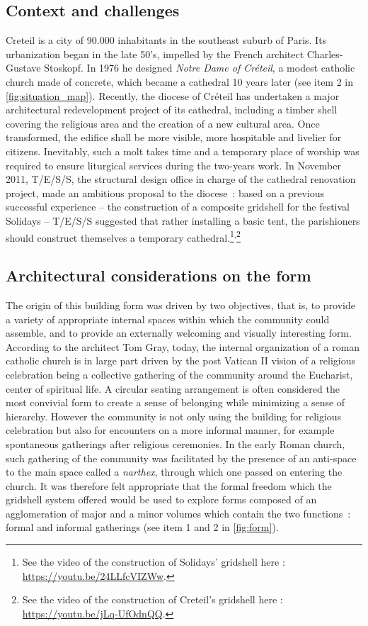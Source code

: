 \subsection{Context and challenges}
Creteil is a city of 90.000 inhabitants in the southeast suburb of Paris. Its urbanization began in the late 50’s, impelled by the French architect Charles-Gustave Stoskopf. In 1976 he designed \emph{Notre Dame of Créteil}, a modest catholic church made of concrete, which became a cathedral 10 years later (see item 2 in \cref{fig:situation_map}). Recently, the diocese of Créteil has undertaken a major architectural redevelopment project of its cathedral, including a timber shell covering the religious area and the creation of a new cultural area. Once transformed, the edifice shall be more visible, more hospitable and livelier for citizens. Inevitably, such a molt takes time and a temporary place of worship was required to ensure liturgical services during the two-years work. In November 2011, T/E/S/S, the structural design office in charge of the cathedral renovation project, made an ambitious proposal to the diocese~: based on a previous successful experience – the construction of a composite gridshell for the festival Solidays \cite{Baverel2012} – T/E/S/S suggested that rather installing a basic tent, the parishioners should construct themselves a temporary cathedral.\footnote{See the video of the construction of Solidays' gridshell here : \url{https://youtu.be/24LLfcVIZWw}.}\textsuperscript{,}\footnote{See the video of the construction of Creteil's gridshell here : \url{https://youtu.be/jLq-UfOdnQQ}.}

\subsection{Architectural considerations on the form}
The origin of this building form was driven by two objectives, that is, to provide a variety of appropriate internal spaces within which the community could assemble, and to provide an externally welcoming and visually interesting form. According to the architect Tom Gray, today, the internal organization of a roman catholic church is in large part driven by the post Vatican II vision of a religious celebration being a collective gathering of the community around the Eucharist, center of spiritual life. A circular seating arrangement is often considered the most convivial form to create a sense of belonging while minimizing a sense of hierarchy. However the community is not only using the building for religious celebration but also for encounters on a more informal manner, for example spontaneous gatherings after religious ceremonies. In the early Roman church, such gathering of the community was facilitated by the presence of an anti-space to the main space called a \emph{narthex}, through which one passed on entering the church. It was therefore felt appropriate that the formal freedom which the gridshell system offered would be used to explore forms composed of an agglomeration of major and a minor volumes which contain the two functions~: formal and informal gatherings (see item 1 and 2 in \cref{fig:form}).

